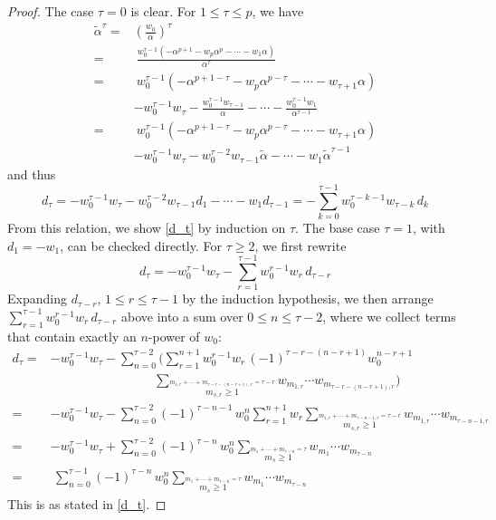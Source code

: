 \documentclass{gtpart}
\theoremstyle{definition}
\theoremstyle{remark}
\newcommand{\A}{\alpha}
\newcommand{\T}{\tau}
\renewcommand{\=}{\approx}
\renewcommand{\-}{\sim}
\numberwithin{equation}{section}
\numberwithin{thm}{section}
\begin{document}
\begin{proof}
 The case $\T = 0$ is clear.  
 For $1 \leq \T \leq p$, we have 
 \begin{equation*}
  \begin{split}
   \widetilde{\A}^\T = & \left( \frac{w_0}{\A} \right)^{\!\T} \\
                     = & ~ \frac{w_0^{\T - 1} (-\A^{p + 1} - w_p \A^p - \cdots - w_1 \A)}{\A^\T} \\
                     = & ~ w_0^{\T - 1} (-\A^{p + 1 - \T} - w_p \A^{p - \T} - \cdots - w_{\T + 1} \A) \\
                       & - w_0^{\T - 1} w_\T - \frac{w_0^{\T - 1} w_{\T - 1}}{\A} - \cdots - \frac{w_0^{\T - 1} w_1}{\A^{\T - 1}} \\
                     = & ~ w_0^{\T - 1} (-\A^{p + 1 - \T} - w_p \A^{p - \T} - \cdots - w_{\T + 1} \A) \\
                       & - w_0^{\T - 1} w_\T - w_0^{\T - 2} w_{\T - 1} \widetilde{\A} - \cdots - w_1 \widetilde{\A}^{\T - 1} 
  \end{split}
 \end{equation*}
 and thus 
 \[
  d_\T = -w_0^{\T - 1} w_\T - w_0^{\T - 2} w_{\T - 1} d_1 - \cdots - w_1 d_{\T - 1} = -\sum_{k = 0}^{\T - 1} w_0^{\T - k - 1} w_{\T - k} \, d_k 
 \]
 From this relation, we show \eqref{d_t} by induction on $\T$.  
 The base case $\T = 1$, with $d_1 = -w_1$, can be checked directly.  
 For $\T \geq 2$, we first rewrite 
 \[
  d_\T = -w_0^{\T - 1} w_\T - \sum_{r = 1}^{\T - 1} w_0^{r - 1} w_r \, d_{\T - r} 
 \]
 Expanding $d_{\T - r}$, $1 \leq r \leq \T - 1$ by the induction hypothesis, 
 we then arrange $\sum_{r = 1}^{\T - 1} w_0^{r - 1} w_r \, d_{\T - r}$ above into a sum over $0 \leq n \leq \T - 2$, 
 where we collect terms that contain exactly an $n$-power of $w_0$: 
 \begin{equation*}
  \begin{split}
   d_\T = & -w_0^{\T - 1} w_\T - \sum_{n = 0}^{\T - 2} \Bigg( \sum_{r = 1}^{n + 1} w_0^{r - 1} w_r \, (-1)^{\T - r - (n - r + 1)} w_0^{n - r + 1} \\
          & \qquad\qquad\qquad\qquad\, \sum_{\stackrel{\scriptstyle m_{1,r} + \cdots + m_{\T - r - (n - r + 1),r} = \T - r}{m_{s,r} \geq 1}} w_{m_{1,r}} \cdots w_{m_{\T - r - (n - r + 1),r}} \Bigg) \\
        = & -w_0^{\T - 1} w_\T - \sum_{n = 0}^{\T - 2} (-1)^{\T - n - 1} \, w_0^n \sum_{r = 1}^{n + 1} w_r 
            \sum_{\stackrel{\scriptstyle m_{1,r} + \cdots + m_{\T - n - 1,r} = \T - r}{m_{s,r} \geq 1}} w_{m_{1,r}} \cdots w_{m_{\T - n - 1,r}} \\
        = & -w_0^{\T - 1} w_\T + \sum_{n = 0}^{\T - 2} (-1)^{\T - n} \, w_0^n \sum_{\stackrel{\scriptstyle m_1 + \cdots + m_{\T - n} = \T}{m_s \geq 1}} w_{m_1} \cdots w_{m_{\T - n}} \\
        = & ~ \sum_{n = 0}^{\T - 1} (-1)^{\T - n} \, w_0^n \sum_{\stackrel{\scriptstyle m_1 + \cdots + m_{\T - n} = \T}{m_s \geq 1}} w_{m_1} \cdots w_{m_{\T - n}} 
  \end{split}
 \end{equation*}
 This is as stated in \eqref{d_t}.  
\end{proof}
\end{document}
